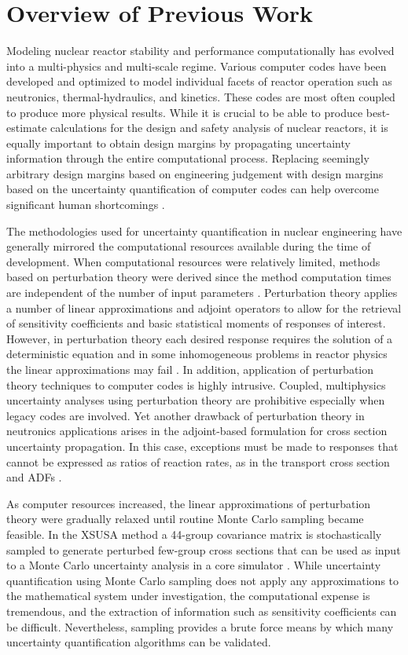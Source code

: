 \section{Overview of Previous Work} 
\label{sec:literature_review}

Modeling nuclear reactor stability and performance computationally has evolved into a multi-physics and multi-scale regime. Various computer codes have been developed and optimized to model individual facets of reactor operation such as neutronics, thermal-hydraulics, and kinetics. These codes are most often coupled to produce more physical results. While it is crucial to be able to produce best-estimate calculations for the design and safety analysis of nuclear reactors, it is equally important to obtain design margins by propagating uncertainty information through the entire computational process. Replacing seemingly arbitrary design margins based on engineering judgement with design margins based on the uncertainty quantification of computer codes can help overcome significant human shortcomings \cite{Eardley}.   

The methodologies used for uncertainty quantification in nuclear engineering have generally mirrored the computational resources available during the time of development. When computational resources were relatively limited, methods based on perturbation theory were derived since the method computation times are independent of the number of input parameters \cite{MLWilliams}. Perturbation theory applies a number of linear approximations and adjoint operators to allow for the retrieval of sensitivity coefficients and basic statistical moments of responses of interest. However, in perturbation theory each desired response requires the solution of a deterministic equation and in some inhomogeneous problems in reactor physics the linear approximations may fail \cite{Gandini}. In addition, application of perturbation theory techniques to computer codes is highly intrusive. Coupled, multiphysics uncertainty analyses using perturbation theory are prohibitive especially when legacy codes are involved. Yet another drawback of perturbation theory in neutronics applications arises in the adjoint-based formulation for cross section uncertainty propagation. In this case, exceptions must be made to responses that cannot be expressed as ratios of reaction rates, as in the transport cross section and \ac{ADFs} \cite{TwoStep_Approach} \cite{Yankov1}. 

As computer resources increased, the linear approximations of perturbation theory were gradually relaxed until routine Monte Carlo sampling became feasible. In the XSUSA method a 44-group covariance matrix is stochastically sampled to generate perturbed few-group cross sections that can be used as input to a Monte Carlo uncertainty analysis in a core simulator \cite{Klein_Gallner}. While uncertainty quantification using Monte Carlo sampling does not apply any approximations to the mathematical system under investigation, the computational expense is tremendous, and the extraction of information such as sensitivity coefficients can be difficult. Nevertheless, sampling provides a brute force means by which many uncertainty quantification algorithms can be validated. 

